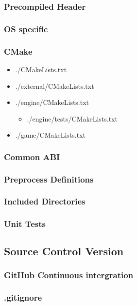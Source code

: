 \newpage
\subsubsection{Precompiled Header}

\newpage
\subsubsection{OS specific}
\label{sec:build_os}

\newpage
\subsubsection{CMake}
\begin{itemize}
    \item ./CMakeLists.txt
    \item ./external/CMakeLists.txt
    \item ./engine/CMakeLists.txt
        \begin{itemize}
            \item ./engine/tests/CMakeLists.txt
        \end{itemize}
    \item ./game/CMakeLists.txt
\end{itemize}

\newpage

\label{sec:abi}
\subsubsection{Common ABI}

\subsubsection{Preprocess Definitions}

\subsubsection{Included Directories}

\subsubsection{Unit Tests}
\label{sec:build_unit_tests}

\subsection{Source Control Version}
\subsubsection{GitHub Continuous intergration}
\subsubsection{.gitignore}